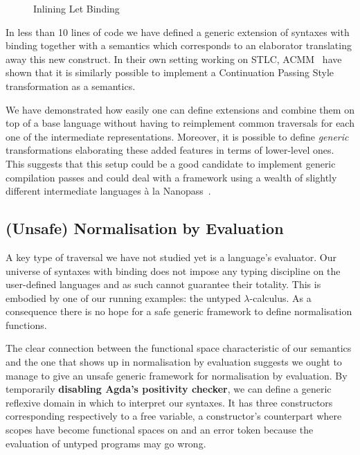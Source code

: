 \begin{figure}[h]
\begin{minipage}{0.45\textwidth}
\end{minipage}\hspace{2em}
\begin{minipage}{0.45\textwidth}
\end{minipage}
\caption{Inlining Let Binding}
\end{figure}

In less than 10 lines of code we have defined a generic extension of
syntaxes with binding together with a semantics which corresponds
to an elaborator translating away this new construct. In their
own setting working on STLC, ACMM~\citeyear{allais2017type} have
shown that it is similarly possible to implement a Continuation
Passing Style transformation as a semantics.

We have demonstrated how easily one can define extensions and combine
them on top of a base language without having to reimplement common
traversals for each one of the intermediate representations. Moreover,
it is possible to define \emph{generic} transformations elaborating
these added features in terms of lower-level ones. This suggests that
this setup could be a good candidate to implement generic compilation
passes and could deal with a framework using a wealth of slightly
different intermediate languages à la Nanopass~\cite{Keep:2013:NFC:2544174.2500618}.

\subsection{(Unsafe) Normalisation by Evaluation}\label{section:nbyeval}

A key type of traversal we have not studied yet is a language's
evaluator. Our universe of syntaxes with binding does not impose
any typing discipline on the user-defined languages and as such
cannot guarantee their totality. This is embodied by one of our running
examples: the untyped $\lambda$-calculus. As a consequence there
is no hope for a safe generic framework to define normalisation
functions.

The clear connection between the  functional space
characteristic of our semantics and the one that shows up in
normalisation by evaluation suggests we ought to manage to
give an unsafe generic framework for normalisation by evaluation.
By temporarily \textbf{disabling Agda's positivity checker},
we can define a generic reflexive domain  in which to
interpret our syntaxes. It has three constructors corresponding
respectively to a free variable, a constructor's counterpart where
scopes have become  functional spaces on  and
an error token because the evaluation of untyped programs may go wrong.

